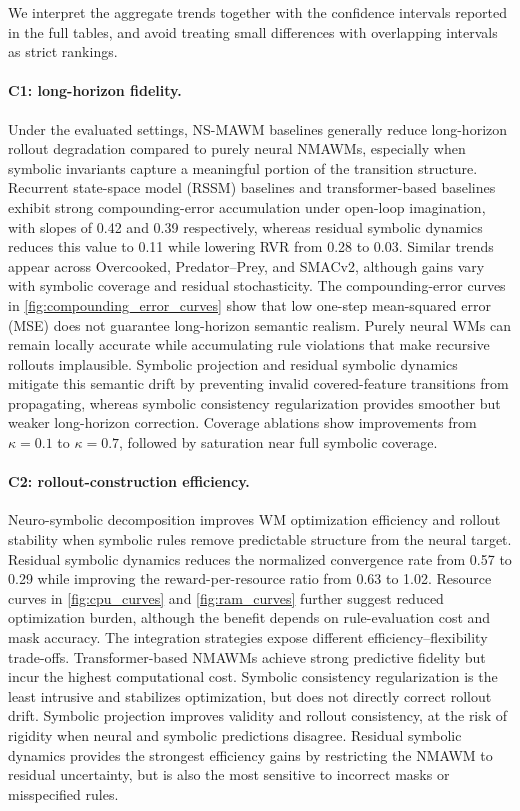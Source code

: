 \documentclass{article}
\theoremstyle{plain}
\theoremstyle{definition}
\theoremstyle{remark}
\begin{document}


We interpret the aggregate trends together with the confidence intervals reported in the full tables, and avoid treating small differences with overlapping intervals as strict rankings.

\paragraph{C1: long-horizon fidelity.}

Under the evaluated settings, NS-MAWM baselines generally reduce long-horizon rollout degradation compared to purely neural NMAWMs, especially when symbolic invariants capture a meaningful portion of the transition structure. Recurrent state-space model (RSSM) baselines and transformer-based baselines exhibit strong compounding-error accumulation under open-loop imagination, with slopes of 0.42 and 0.39 respectively, whereas residual symbolic dynamics reduces this value to 0.11 while lowering RVR from 0.28 to 0.03. Similar trends appear across Overcooked, Predator--Prey, and SMACv2, although gains vary with symbolic coverage and residual stochasticity.
The compounding-error curves in \autoref{fig:compounding_error_curves} show that low one-step mean-squared error (MSE) does not guarantee long-horizon semantic realism. Purely neural WMs can remain locally accurate while accumulating rule violations that make recursive rollouts implausible. Symbolic projection and residual symbolic dynamics mitigate this semantic drift by preventing invalid covered-feature transitions from propagating, whereas symbolic consistency regularization provides smoother but weaker long-horizon correction. Coverage ablations show improvements from $\kappa=0.1$ to $\kappa=0.7$, followed by saturation near full symbolic coverage.

\paragraph{C2: rollout-construction efficiency.}

Neuro-symbolic decomposition improves WM optimization efficiency and rollout stability when symbolic rules remove predictable structure from the neural target. Residual symbolic dynamics reduces the normalized convergence rate from 0.57 to 0.29 while improving the reward-per-resource ratio from 0.63 to 1.02. Resource curves in \autoref{fig:cpu_curves} and \autoref{fig:ram_curves} further suggest reduced optimization burden, although the benefit depends on rule-evaluation cost and mask accuracy.
The integration strategies expose different efficiency--flexibility trade-offs. Transformer-based NMAWMs achieve strong predictive fidelity but incur the highest computational cost. Symbolic consistency regularization is the least intrusive and stabilizes optimization, but does not directly correct rollout drift. Symbolic projection improves validity and rollout consistency, at the risk of rigidity when neural and symbolic predictions disagree. Residual symbolic dynamics provides the strongest efficiency gains by restricting the NMAWM to residual uncertainty, but is also the most sensitive to incorrect masks or misspecified rules.
\end{document}
